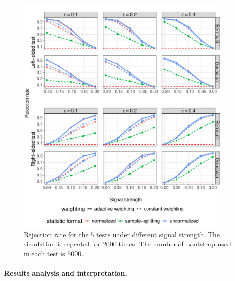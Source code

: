 \documentclass[12pt]{article}
\begin{document}
\begin{figure}[!ht]
	\centering
	\includegraphics[width=0.95\textwidth]{figures-and-tables/simulation/thompson_rejection_plot.pdf}

	\caption{Rejection rate for the $5$ tests under different signal strength. The simulation is repeated for $2000$ times. The number of bootstrap used in each test is $5000$.}
	\label{fig:simulation-rejection-plot-thompson}
\end{figure}


\paragraph{Results analysis and interpretation.}
\end{document}
